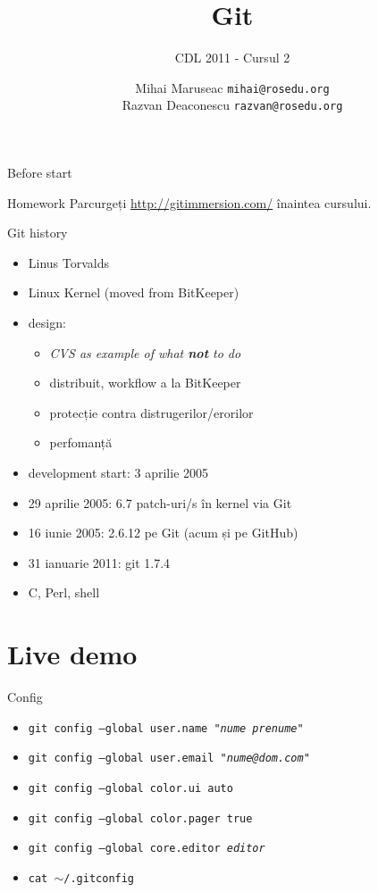 \documentclass{beamer}
\title[]{Git}
\subtitle{CDL 2011 - Cursul 2}
\institute[]{ROSEdu}
\author[]{
  Mihai Maruseac \texttt{mihai@rosedu.org} \\
  Razvan Deaconescu \texttt{razvan@rosedu.org}
}
\begin{document}
\maketitle

\begin{frame}{Before start}
  \begin{alertblock}{Homework}
    Parcurgeți \url{http://gitimmersion.com/} înaintea cursului.
  \end{alertblock}
\end{frame}

\begin{frame}{Git history}
  \begin{itemize}
    \item Linus Torvalds
    \item Linux Kernel (moved from BitKeeper)
    \item design:
      \begin{itemize}
        \item \textit{CVS as example of what \textbf{not} to do}
        \item distribuit, workflow a la BitKeeper
        \item protecție contra distrugerilor/erorilor
        \item perfomanță
      \end{itemize}
    \item development start: 3 aprilie 2005
    \item 29 aprilie 2005: 6.7 patch-uri/s în kernel via Git
    \item 16 iunie 2005: 2.6.12 pe Git (acum și pe GitHub)
    \item 31 ianuarie 2011: git 1.7.4
    \item C, Perl, shell
  \end{itemize}
\end{frame}

\section{Live demo}

\begin{frame}{Config}
  \begin{itemize}
    \item \texttt{git config --global user.name "\textit{nume prenume}"}
    \item \texttt{git config --global user.email "\textit{nume@dom.com}"}
    \item \texttt{git config --global color.ui auto}
    \item \texttt{git config --global color.pager true}
    \item \texttt{git config --global core.editor \textit{editor}}
    \item \texttt{cat $\sim$/.gitconfig}
  \end{itemize}
\end{frame}
\end{document}
